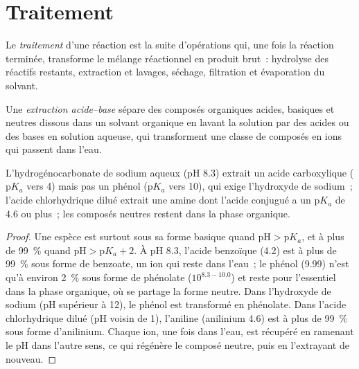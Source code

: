 \section{Traitement}

\begin{definition}[Traitement]\label{def:b2:lab-techniques-2:work-up}
Le \emph{traitement} d'une réaction est la
suite d'opérations qui, une fois la réaction terminée, transforme le mélange réactionnel en produit
brut~: hydrolyse des réactifs restants, extraction et lavages, séchage, filtration et évaporation du solvant.
\end{definition}

\begin{definition}\label{def:b2:lab-techniques-2:acid-base-extraction}
Une \emph{extraction acide--base} sépare des composés organiques acides,
basiques et neutres dissous dans un solvant organique en lavant la solution par des acides ou des bases
en solution aqueuse, qui transforment une classe de composés en ions qui passent dans l'eau.
\end{definition}

\begin{proposition}[Qui va où]\label{prop:b2:lab-techniques-2:acid-base-extraction}
L'hydrogénocarbonate de sodium aqueux (pH 8.3) extrait un acide carboxylique ($\mathrm pK_a$ vers 4)
mais pas un phénol ($\mathrm pK_a$ vers 10), qui exige l'hydroxyde de sodium~; l'acide chlorhydrique
dilué extrait une amine dont l'acide conjugué a un $\mathrm pK_a$ de 4.6 ou plus~; les composés neutres
restent dans la phase organique.
\end{proposition}

\begin{proof}
Une espèce est surtout sous sa forme basique quand $\mathrm{pH} > \mathrm pK_a$, et à plus de 99~\% quand
$\mathrm{pH} > \mathrm pK_a + 2$. À pH 8.3, l'acide benzoïque (4.2) est à plus de 99~\% sous forme de
benzoate, un ion qui reste dans l'eau~; le phénol (9.99) n'est qu'à environ 2~\% sous forme de phénolate
($10^{8.3 - 10.0}$) et reste pour l'essentiel dans la phase organique, où se partage la forme neutre.
Dans l'hydroxyde de sodium (pH supérieur à 12), le phénol est transformé en phénolate. Dans l'acide
chlorhydrique dilué (pH voisin de 1), l'aniline (anilinium 4.6) est à plus de 99~\% sous forme
d'anilinium. Chaque ion, une fois dans l'eau, est récupéré en ramenant le pH dans l'autre sens, ce qui
régénère le composé neutre, puis en l'extrayant de nouveau.
\end{proof}

